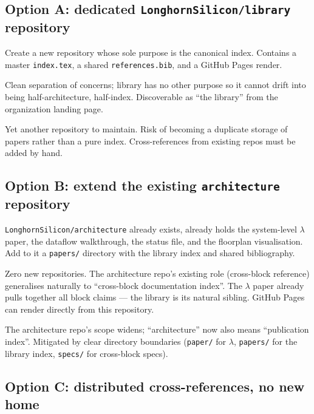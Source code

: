 \documentclass[11pt]{article}
\begin{document}
\subsection{Option A: dedicated \texttt{LonghornSilicon/library} repository}

Create a new repository whose sole purpose is the canonical index.
Contains a master \texttt{index.tex}, a shared \texttt{references.bib},
and a GitHub Pages render.

\begin{description}[leftmargin=2em,style=nextline]
\item[Pros]
Clean separation of concerns; library has no other purpose so it
cannot drift into being half-architecture, half-index. Discoverable
as ``the library'' from the organization landing page.
\item[Cons]
Yet another repository to maintain. Risk of becoming a duplicate
storage of papers rather than a pure index. Cross-references from
existing repos must be added by hand.
\end{description}

\subsection{Option B: extend the existing \texttt{architecture} repository}

\texttt{LonghornSilicon/architecture} already exists, already holds
the system-level $\lambda$ paper, the dataflow walkthrough, the
status file, and the floorplan visualisation. Add to it a
\texttt{papers/} directory with the library index and shared
bibliography.

\begin{description}[leftmargin=2em,style=nextline]
\item[Pros]
Zero new repositories. The architecture repo's existing role
(cross-block reference) generalises naturally to ``cross-block
documentation index''. The $\lambda$ paper already pulls together
all block claims --- the library is its natural sibling. GitHub
Pages can render directly from this repository.
\item[Cons]
The architecture repo's scope widens; ``architecture'' now also
means ``publication index''. Mitigated by clear directory boundaries
(\texttt{paper/} for $\lambda$, \texttt{papers/} for the library
index, \texttt{specs/} for cross-block specs).
\end{description}

\subsection{Option C: distributed cross-references, no new home}
\end{document}
